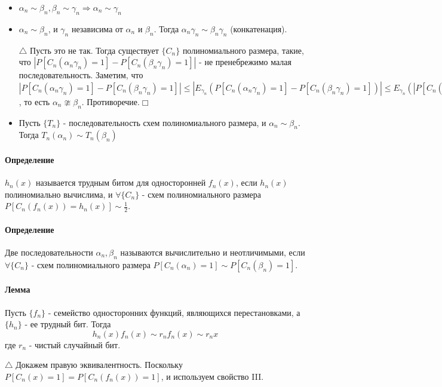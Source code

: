 \documentclass[12pt, a4paper]{article}
\begin{document}
\begin{itemize}
 \item[1)] $\alpha_n \sim \beta_n, \beta_n \sim \gamma_n \Rightarrow \alpha_n \sim \gamma_n$
 \item[2)] $\alpha_n \sim \beta_n$, и $\gamma_n$ независима от $\alpha_n$ и $\beta_n$. Тогда $\alpha_n\gamma_n \sim \beta_n\gamma_n$ (конкатенация).
 
 $\triangle$ Пусть это не так. Тогда существует $\{C_n\}$ полиномиального размера, такие, что
 $|P[C_n(\alpha_n\gamma_n)=1] - P[C_n(\beta_n\gamma_n)=1]|$ - не пренебрежимо малая последовательность. Заметим, что $|P[C_n(\alpha_n\gamma_n)=1] - P[C_n(\beta_n\gamma_n)=1]| \leq |E_{\gamma_n}(P[C_n(\alpha_n\gamma_n)=1] - P[C_n(\beta_n\gamma_n)=1])| \leq E_{\gamma_n}(|P[C_n(\alpha_n\gamma_n)=1] - P[C_n(\beta_n\gamma_n)=1]|) \leq |P[C_n(\alpha_n\gamma_{max})=1] - P[C_n(\beta_n\gamma_{max})=1])|$, то есть $\alpha_n \ncong \beta_n$. Противоречие.$\Box$
 \item[3)] Пусть $\{T_n\}$ - последовательность схем полиномиального размера, и $\alpha_n \sim \beta_n$. Тогда $T_n(\alpha_n) \sim T_n(\beta_n)$
\end{itemize}

\paragraph{Определение} $h_n(x)$ называется трудным битом для односторонней $f_n(x)$, если $h_n(x)$ полиномиально вычислима, и $\forall \{C_n\}$ - схем полиномиального размера $P[C_n(f_n(x))=h_n(x)] \sim \frac{1}{2}$.

\paragraph{Определение} Две последовательности $\alpha_n, \beta_n$ называются вычислительно и неотличимыми, если $\forall \{C_n\}$ - схем полиномиального размера $P[C_n(\alpha_n)=1] \sim P[C_n(\beta_n)=1]$.

\paragraph{Лемма} Пусть $\{f_n\}$ - семейство односторонних функций, являющихся перестановками, а $\{h_n\}$ - ее трудный бит. Тогда
\[
 h_n(x)f_n(x) \sim r_n f_n(x) \sim r_n x
\]
где $r_n$ - чистый случайный бит.

$\triangle$ Докажем правую эквивалентность. Поскольку $P[C_n(x)=1]=P[C_n(f_n(x))=1]$, и используем свойство III.
\end{document}
